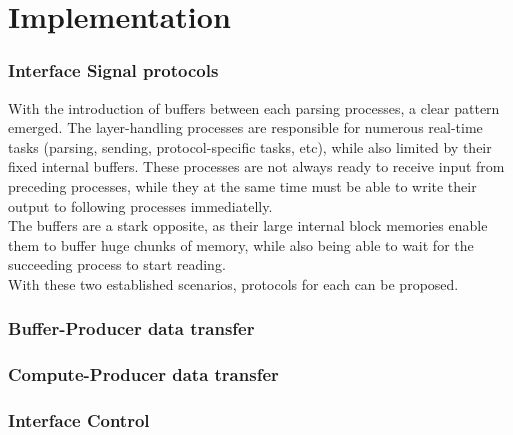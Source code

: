 \chapter{Implementation}
\label{chap:implementation}
\subsection{Interface Signal protocols}
\label{sec:interface_signal_protocol}
With the introduction of buffers between each parsing processes, a clear pattern
emerged. The layer-handling processes are responsible for numerous real-time tasks 
(parsing, sending, protocol-specific tasks, etc), while also limited by their 
fixed internal buffers. These processes are not always ready to receive input 
from preceding processes, while they at the same time must be able to write their
output to following processes immediatelly.\\
The buffers are a stark opposite, as their large internal block memories enable
them to buffer huge chunks of memory, while also being able to wait for the 
succeeding process to start reading.\\
With these two established scenarios, protocols for each can be proposed.  

\subsection{Buffer-Producer data transfer}

\subsection{Compute-Producer data transfer}

\subsection{Interface Control}
